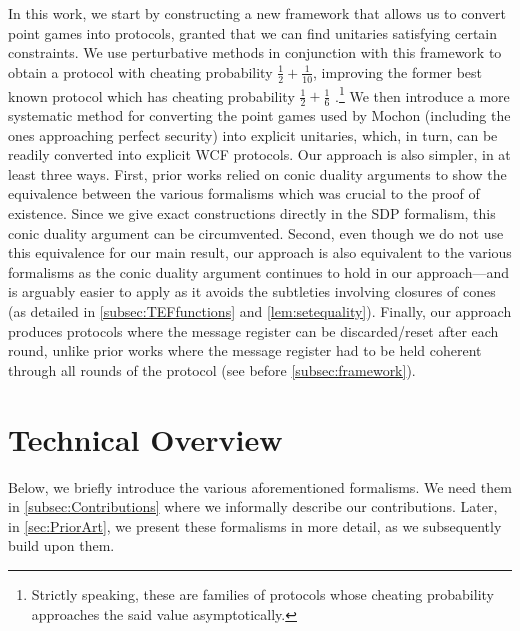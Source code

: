 \documentclass{theoretics}
\begin{document}
%
In this work,
we start by constructing a new framework that allows us to convert point games into protocols, granted that we can find unitaries satisfying certain constraints. We use perturbative methods in conjunction with this framework to obtain a protocol with cheating probability $\frac{1}{2}+\frac{1}{10}$, improving the former best known protocol which has cheating probability $\frac{1}{2}+\frac{1}{6}$ \cite{Mochon05}.\footnote{Strictly speaking, these are families of protocols whose cheating probability approaches
  the said value asymptotically.} We then introduce a more systematic method for converting the point games used by Mochon (including the ones approaching perfect security) into explicit unitaries, which, in turn, can be readily converted
into explicit WCF protocols. %
  {%
    Our approach is also simpler, in at least three ways. First, prior works relied on conic duality arguments to show the equivalence between the various formalisms which was crucial to the proof of existence. Since we give exact constructions directly in the SDP formalism, this conic duality argument can be circumvented. Second, even though we do not use this equivalence for our main result, our approach is also equivalent to the various formalisms as the conic duality argument continues to hold in our approach---and is arguably easier to apply as it avoids the subtleties involving closures of cones (as detailed in \cref{subsec:TEFfunctions} and \cref{lem:setequality}). %
    Finally, our approach produces protocols where the message register can be discarded/reset after each round, unlike prior works where the message register had to be held coherent through all rounds of the protocol (see before \cref{subsec:framework}). }
%




\section{Technical Overview}
Below, we briefly introduce the various aforementioned formalisms. We need them in \cref{subsec:Contributions} where we informally describe our contributions. Later, in \cref{sec:PriorArt}, we present these formalisms in more detail, as we subsequently build upon them. %

%
%
%
\end{document}
